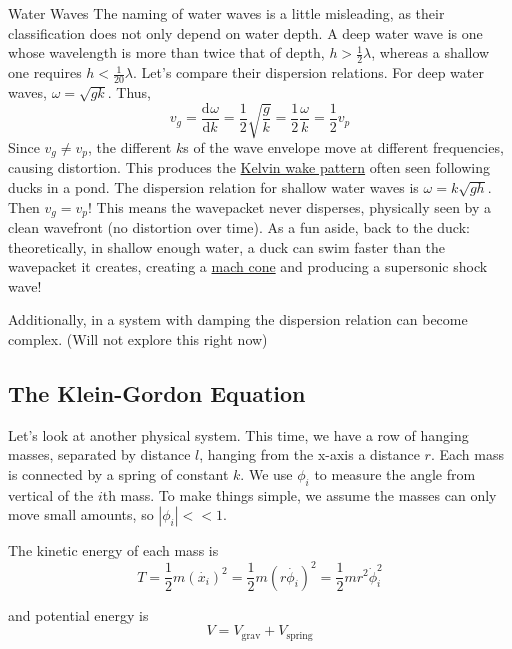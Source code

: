 \documentclass[12pt]{article}
\def\tab{\indent\hspace{15pt}}
\def\D{\mathrm{d}}
\newcommand{\diff}[3][]{\ensuremath{\frac{\D^{#1} #2}{\D #3^{#1}}}}
\begin{document}
\begin{example}{Water Waves}{}
	The naming of water waves is a little misleading, as their classification does not only depend on water depth. A deep water wave is one whose wavelength is more than twice that of depth, $h > \frac{1}{2}\lambda$, whereas a shallow one requires $h < \frac{1}{20}\lambda$. Let's compare their dispersion relations.
	For deep water waves, $\omega = \sqrt{gk}$. Thus,
	\begin{equation*}
		v_g = \diff[]{\omega}{k} = \frac{1}{2} \sqrt{\frac{g}{k}} = \frac{1}{2}\frac{\omega}{k} = \frac{1}{2} v_p
	\end{equation*}
	Since $v_g \neq v_p$, the different $k$s of the wave envelope move at different frequencies, causing distortion. This produces the \href{https://en.wikipedia.org/wiki/Kelvin_wake_pattern}{Kelvin wake pattern} often seen following ducks in a pond.\medbreak
	The dispersion relation for shallow water waves is $\omega = k\sqrt{gh}$. Then $v_g = v_p$! This means the wavepacket never disperses, physically seen by a clean wavefront (no distortion over time).\medbreak
	As a fun aside, back to the duck: theoretically, in shallow enough water, a duck can swim faster than the wavepacket it creates, creating a \href{https://www.wikiwand.com/en/articles/Mach_wave}{mach cone} and producing a supersonic shock wave!

\end{example}

Additionally, in a system with damping the dispersion relation can become complex. (Will not explore this right now)


\subsection{The Klein-Gordon Equation}
Let's look at another physical system. This time, we have a row of hanging masses, separated by distance $l$, hanging from the x-axis a distance $r$. Each mass is connected by a spring of constant $k$. We use $\phi_i$ to measure the angle from vertical of the $i$th mass. To make things simple, we assume the masses can only move small amounts, so $|\phi_i| << 1$.

\tab The kinetic energy of each mass is
\begin{equation*}
	T = \frac{1}{2}m(\dot{x_i})^2 = \frac{1}{2}m(r\dot{\phi_i})^2 = \frac{1}{2}mr^2\dot{\phi}_i^2
\end{equation*}

and potential energy is
\begin{equation*}
	V = V_{\text{grav}} + V_{\text{spring}}
\end{equation*}
\end{document}
